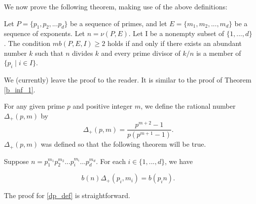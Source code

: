 \documentclass[../paper.tex]{article}
\begin{document}
We now prove the following theorem, making use of the above
definitions:

\begin{theorem}
Let $P = \{p_1, p_2, ... p_d\}$ be a sequence of primes, and let
$E = \{m_1, m_2, ..., m_d\}$ be a sequence of exponents. Let $n =
\nu(P,E)$. Let I be a nonempty subset of $\{1, ..., d\}$. The 
condition $mb(P,E,I) \geq 2$ holds if and only if there exists an 
abundant number $k$ such that $n$ divides $k$ and every prime 
divisor of $k/n$ is a member of $\{p_i \mid i \in I\}$.
\end{theorem}

We (currently) leave the proof to the reader. It is 
similar to the proof of Theorem {\ref{b_inf_1}}.

For any given prime $p$ and positive integer $m$, we define the
rational number $\Delta_+(p,m)$ by
$$\Delta_+(p,m) = \frac{p^{m+2} - 1}{ p (p^{m + 1} -
1)} .$$
$\Delta_+(p,m)$ was defined so that the following theorem will
be true.

\begin{theorem}\label{dp_def}
Suppose $n = p_1^{m_1} p_2^{m_2} ... p_i^{m_i} ... p_d^{m_d}$.
For each $i \in \{1,...,d\}$, we have

$$ b(n) \Delta_+(p_i, m_i) = b(p_i n) .$$
\end{theorem}

The proof for {\ref{dp_def}} is straightforward.
\end{document}
